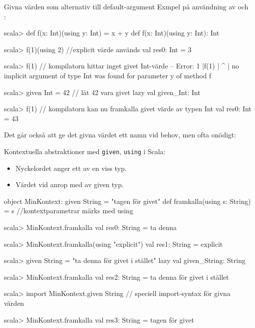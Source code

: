 \begin{Slide}{Givna värden som alternativ till default-argument}\SlideFontSmall
Exmpel på användning av  och :
\begin{REPL}
scala> def f(x: Int)(using y: Int) = x + y
def f(x: Int)(using y: Int): Int

scala> f(1)(using 2)    //explicit värde används
val res0: Int = 3

scala> f(1)        // kompilatorn hittar inget givet Int-värde
-- Error:
1 |f(1)
  |    ^
  |  no implicit argument of type Int was found for parameter y of method f

scala> given Int = 42    // låt 42 vara givet 
lazy val given_Int: Int

scala> f(1)       // kompilatorn kan nu framkalla givet värde av typen Int
val res0: Int = 43
\end{REPL}
Det går också att ge det givna värdet ett namn vid behov, men ofta onödigt:\\
\end{Slide}


\begin{Slide}{Kontextuella abstraktioner med \texttt{given}, \texttt{using}}\SlideFontSmall
{}  i Scala:
\begin{itemize}\SlideFontSmall
\item Nyckelordet  anger ett  av en viss typ.
\item Värdet  vid anrop med  av given typ.
\end{itemize}
\begin{Code}
object MinKontext:
  given String = "tagen för givet"
  def framkalla(using s: String) = s  //kontextparametrar märks med using
\end{Code}
\vspace{-0.9em}
\begin{REPLsmall}
scala> MinKontext.framkalla
val res0: String = ta denna

scala> MinKontext.framkalla(using "explicit")
val res1: String = explicit

scala> given String = "ta denna för givet i stället"
lazy val given_String: String

scala> MinKontext.framkalla
val res2: String = ta denna för givet i stället

scala> import MinKontext.given String    // speciell import-syntax för givna värden

scala> MinKontext.framkalla
val res3: String = tagen för givet
\end{REPLsmall}
\end{Slide}

